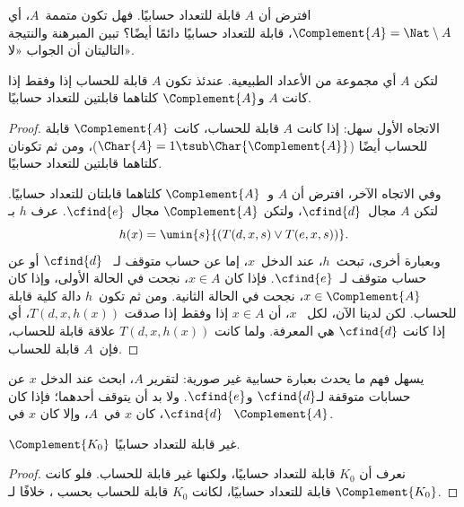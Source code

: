 \documentclass[../../../include/open-logic-section]{subfiles}
\begin{document}

افترض أن $A$ قابلة للتعداد حسابيًا. فهل تكون متممة~$A$، أي
$\Complement{A}=\Nat\setminus A$، قابلة للتعداد حسابيًا دائمًا أيضًا؟
تبين المبرهنة والنتيجة التاليتان أن الجواب «لا».

\begin{thm}
لتكن $A$ أي مجموعة من الأعداد الطبيعية. عندئذ تكون $A$ قابلة للحساب
إذا وفقط إذا كانت $A$ و$\Complement{A}$ كلتاهما قابلتين للتعداد
حسابيًا.
\end{thm}

\begin{proof}
الاتجاه الأول سهل: إذا كانت $A$ قابلة للحساب، كانت $\Complement{A}$
قابلة للحساب أيضًا ($\Char{A}=1\tsub\Char{\Complement{A}}$)، ومن ثم
تكونان كلتاهما قابلتين للتعداد حسابيًا.

وفي الاتجاه الآخر، افترض أن $A$ و~$\Complement{A}$ كلتاهما قابلتان
للتعداد حسابيًا. لتكن $A$ مجال~$\cfind{d}$، ولتكن
$\Complement{A}$ مجال~$\cfind{e}$. عرف $h$ بـ
\[
h(x) = \umin{s}{(T(d,x,s) \lor T(e,x,s))}.
\]
وبعبارة أخرى، تبحث~$h$، عند الدخل~$x$، إما عن حساب متوقف لـ
~$\cfind{d}$ أو عن حساب متوقف لـ~$\cfind{e}$. فإذا كان $x\in A$،
نجحت في الحالة الأولى، وإذا كان $x\in\Complement{A}$، نجحت في الحالة
الثانية. ومن ثم تكون~$h$ دالة كلية قابلة للحساب. لكن لدينا الآن، لكل
~$x$، أن $x\in A$ إذا وفقط إذا صدقت $T(d,x,h(x))$، أي إذا كانت
$\cfind{d}$ هي المعرفة. ولما كانت $T(d,x,h(x))$ علاقة قابلة للحساب،
فإن~$A$ قابلة للحساب.
\end{proof}

\begin{explain}
يسهل فهم ما يحدث بعبارة حسابية غير صورية: لتقرير $A$، ابحث عند الدخل
$x$ عن حسابات متوقفة لـ$\cfind{d}$ و$\cfind{e}$. ولا بد أن يتوقف
أحدهما؛ فإذا كان $\cfind{d}$، كان $x$ في~$A$، وإلا كان $x$ في
~$\Complement{A}$.
\end{explain}

\begin{cor}
$\Complement{K_0}$ غير قابلة للتعداد حسابيًا.
\end{cor}

\begin{proof}
نعرف أن $K_0$ قابلة للتعداد حسابيًا، ولكنها غير قابلة للحساب. فلو كانت
$\Complement{K_0}$ قابلة للتعداد حسابيًا، لكانت $K_0$ قابلة للحساب
بحسب ، خلافًا لـ.
\end{proof}
\end{document}
